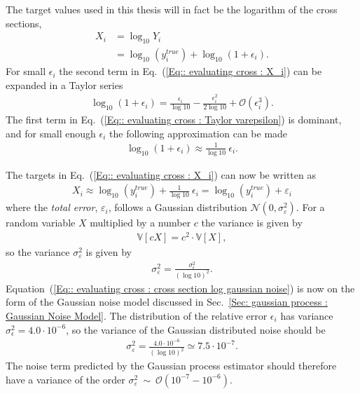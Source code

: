 \documentclass[twoside,english]{uiofysmaster}
\begin{document}
{{The target values used in this thesis will in fact be the logarithm of the cross sections, 
\begin{align}
X_i &= \log_{10} Y_i \nonumber \\
&= \log_{10}(y_i^{true})  + \log_{10}(1 + \epsilon_i).\label{Eq:: evaluating cross : X_i}
\end{align}
For small $\epsilon_i$ the second term in Eq.~(\ref{Eq:: evaluating cross : X_i}) can be expanded in a Taylor series
\begin{align}\label{Eq:: evaluating cross : Taylor varepsilon}
\log_{10}(1 + \epsilon_i) = \frac{\epsilon_i}{\log 10} - \frac{\epsilon_i^2}{2 \log 10} + \mathcal{O}(\epsilon_i^3). 
\end{align} 
The first term in Eq.~(\ref{Eq:: evaluating cross : Taylor varepsilon}) is dominant, and for small enough $\epsilon_i$ the following approximation can be made
\begin{align}
\log_{10}(1 + \epsilon_i) \approx \frac{1}{\log 10} ~\epsilon_i.
\end{align}

The targets in Eq.~(\ref{Eq:: evaluating cross : X_i}) can now be written as
\begin{align}\label{Eq:: evaluating cross : cross section log gaussian noise}
X_i \approx \log_{10}(y_i^{true}) + \frac{1}{\log 10} ~\epsilon_i = \log_{10}(y_i^{true}) + \varepsilon_i 
\end{align}
where the \textit{total error}, $\varepsilon_i$, follows a Gaussian distribution $\mathcal{N}(0, \sigma_{\varepsilon}^2)$. For a random variable $X$ multiplied by a number $c$ the variance is given by
\begin{align}
\mathbb{V}[c X] = c^2 \cdot \mathbb{V}[X],
\end{align}
so the variance $\sigma_{\varepsilon}^2$ is given by
\begin{align}
\sigma_{\varepsilon}^2 = \frac{\sigma_{\epsilon}^2}{(\log 10)^2}.
\end{align}
Equation~(\ref{Eq:: evaluating cross : cross section log gaussian noise}) is now on the form of the Gaussian noise model discussed in Sec.~\ref{Sec: gaussian process : Gaussian Noise Model}. The distribution of the relative error $\epsilon_i$ has variance $\sigma_{\epsilon}^2 = 4.0 \cdot 10^{-6}$, so the variance of the Gaussian distributed noise should be
\begin{align*}
\sigma_{\varepsilon}^2 =  \frac{4.0 \cdot 10^{-6}}{(\log 10)^2} \simeq 7.5 \cdot 10^{-7}.
\end{align*}
The noise term predicted by the Gaussian process estimator should therefore have a variance of the order $\sigma_{\varepsilon}^2~\sim~\mathcal{O}(10^{-7}- 10^{-6})$.


}}
\end{document}
